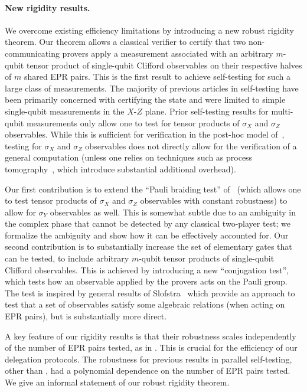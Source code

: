 \documentclass{toc}
\begin{document}
\paragraph{New rigidity results.} 
We overcome existing efficiency limitations by introducing a new robust rigidity theorem. Our theorem allows a classical verifier to certify that two non-communicating provers apply a measurement associated with an arbitrary $m$-qubit tensor product of single-qubit Clifford observables on their respective halves of $m$ shared EPR pairs.
This is the first result to achieve self-testing for such a large class of
measurements. The majority of previous %
articles  %
in self-testing have been primarily
concerned with certifying the state and were limited to simple single-qubit
measurements in the $X$-$Z$ plane. Prior self-testing results for multi-qubit
measurements only allow one to test for tensor products of $\sigma_X$ and $\sigma_Z$
observables. While this is sufficient for verification in the post-hoc model
of~\cite{hajdusek2015posthoc-updated}, testing for $\sigma_X$ and $\sigma_Z$ observables
does not directly allow for the verification of a general computation (unless
one relies on techniques such as process
tomography~\cite{reichardt2012classical}, which introduce substantial additional
overhead).  

Our first contribution is to extend the ``Pauli braiding test'' of~\cite{natarajan2016robust} (which allows one to test tensor products of $\sigma_X$ and $\sigma_Z$ observables with constant robustness) to allow for $\sigma_Y$ observables as well. This is somewhat subtle due to an ambiguity in the complex phase that cannot be detected by any classical two-player test; we formalize the ambiguity and show how it can be effectively accounted for. Our second contribution is to substantially increase the set of elementary gates that can be tested, to include arbitrary $m$-qubit tensor products of single-qubit Clifford observables. This is achieved by introducing a new ``conjugation test'', which tests how an observable applied by the provers acts on the Pauli group. The test is inspired by general results of Slofstra~\cite{slofstra2016tsirelson} which provide an approach to test that a set of observables satisfy some algebraic relations (when acting on EPR pairs), but is substantially more direct. 

 A key feature of our rigidity results is that their robustness scales independently of the number of EPR pairs tested, as in \cite{natarajan2016robust}. This is crucial for the efficiency of our delegation protocols. The robustness for previous results in parallel self-testing, other than \cite{natarajan2016robust}, had a polynomial dependence on the number of EPR pairs tested. We give an informal statement of our robust rigidity theorem.
 
\end{document}
